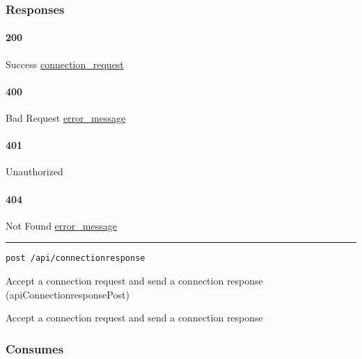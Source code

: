 \hypertarget{responses-55}{%
\subsubsection{Responses}\label{responses-55}}

\hypertarget{section-180}{%
\paragraph{200}\label{section-180}}

Success \protect\hyperlink{connection_request}{connection\_request}

\hypertarget{section-181}{%
\paragraph{400}\label{section-181}}

Bad Request \protect\hyperlink{error_message}{error\_message}

\hypertarget{section-182}{%
\paragraph{401}\label{section-182}}

Unauthorized \protect\hyperlink{}{}

\hypertarget{section-183}{%
\paragraph{404}\label{section-183}}

Not Found \protect\hyperlink{error_message}{error\_message}

\begin{center}\rule{0.5\linewidth}{\linethickness}\end{center}

\protect\hypertarget{apiConnectionresponsePost}{}{}

\begin{verbatim}
post /api/connectionresponse
\end{verbatim}

Accept a connection request and send a connection response
({apiConnectionresponsePost})

Accept a connection request and send a connection response

\hypertarget{consumes-17}{%
\subsubsection{Consumes}\label{consumes-17}}

